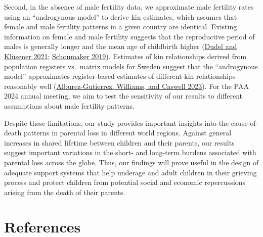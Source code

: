 \documentclass[
  11pt,
  letterpaper,
]{article}
\begin{document}
Second, in the absence of male fertility data, we approximate male fertility rates using an ``androgynous model'' to derive kin estimates, which assumes that female and male fertility patterns in a given country are identical. Existing information on female and male fertility suggests that the reproductive period of males is generally longer and the mean age of childbirth higher (\protect\hyperlink{ref-dudel2021fertility}{Dudel and Klüsener 2021}; \protect\hyperlink{ref-Schoumaker2019}{Schoumaker 2019}). Estimates of kin relationships derived from population registers vs.~matrix models for Sweden suggest that the ``androgynous model'' approximates register-based estimates of different kin relationships reasonably well (\protect\hyperlink{ref-alburez2023projections}{Alburez-Gutierrez, Williams, and Caswell 2023}). For the PAA 2024 annual meeting, we aim to test the sensitivity of our results to different assumptions about male fertility patterns.

Despite these limitations, our study provides important insights into the cause-of-death patterns in parental loss in different world regions. Against general increases in shared lifetime between children and their parents, our results suggest important variations in the short- and long-term burdens associated with parental loss across the globe. Thus, our findings will prove useful in the design of adequate support systems that help underage and adult children in their grieving process and protect children from potential social and economic repercussions arising from the death of their parents.

\newpage

\hypertarget{references}{%
\section*{References}\label{references}}
\end{document}
